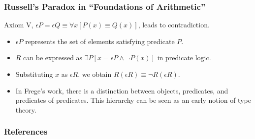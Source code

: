 \documentclass[unicode, 14pt, aspectratio=169]{beamer}
\begin{document}
\begin{frame}
  \frametitle{Russell's Paradox in ``Foundations of Arithmetic''}
  {\large Axiom V, $\epsilon P=\epsilon Q \equiv \forall x [P(x)\equiv Q(x)]$, leads to contradiction.}
  \begin{itemize}
  \item $\epsilon P$ represents the set of elements satisfying predicate $P$.
  \item $R$ can be expressed as $\exists P [x = \epsilon P \wedge \neg P(x)]$ in predicate logic.
  \item Substituting $x$ as $\epsilon R$, we obtain $R(\epsilon R) \equiv \neg R(\epsilon R)$.    
  \item In Frege's work, there is a distinction between objects, predicates, and predicates of predicates. This hierarchy can be seen as an early notion of type theory.
  \end{itemize}
\end{frame}
\begin{frame}[allowframebreaks,t]
  \frametitle{References}
  \printbibliography
  \nocite{*}
\end{frame}
\end{document}
